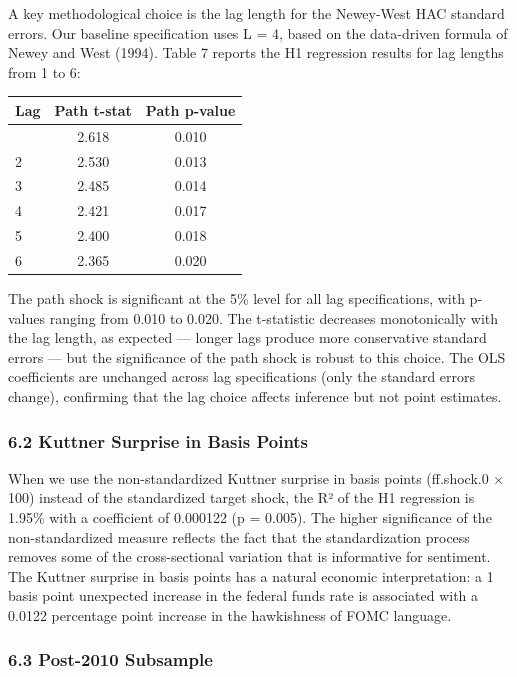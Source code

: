 \documentclass[
]{article}
\begin{document}
A key methodological choice is the lag length for the Newey-West HAC
standard errors. Our baseline specification uses L = 4, based on the
data-driven formula of Newey and West (1994). Table 7 reports the H1
regression results for lag lengths from 1 to 6:

\begin{longtable}[]{@{}lcc@{}}
\toprule\noalign{}
Lag & Path t-stat & Path p-value \\
\midrule\noalign{}
\endhead
\bottomrule\noalign{}
\endlastfoot
1 & 2.618 & 0.010 \\
2 & 2.530 & 0.013 \\
3 & 2.485 & 0.014 \\
4 & 2.421 & 0.017 \\
5 & 2.400 & 0.018 \\
6 & 2.365 & 0.020 \\
\end{longtable}

The path shock is significant at the 5\% level for all lag
specifications, with p-values ranging from 0.010 to 0.020. The
t-statistic decreases monotonically with the lag length, as expected ---
longer lags produce more conservative standard errors --- but the
significance of the path shock is robust to this choice. The OLS
coefficients are unchanged across lag specifications (only the standard
errors change), confirming that the lag choice affects inference but not
point estimates.

\subsubsection{6.2 Kuttner Surprise in Basis
Points}\label{kuttner-surprise-in-basis-points}

When we use the non-standardized Kuttner surprise in basis points
(ff.shock.0 × 100) instead of the standardized target shock, the R² of
the H1 regression is 1.95\% with a coefficient of 0.000122 (p = 0.005).
The higher significance of the non-standardized measure reflects the
fact that the standardization process removes some of the
cross-sectional variation that is informative for sentiment. The Kuttner
surprise in basis points has a natural economic interpretation: a 1
basis point unexpected increase in the federal funds rate is associated
with a 0.0122 percentage point increase in the hawkishness of FOMC
language.

\subsubsection{6.3 Post-2010 Subsample}\label{post-2010-subsample}
\end{document}
